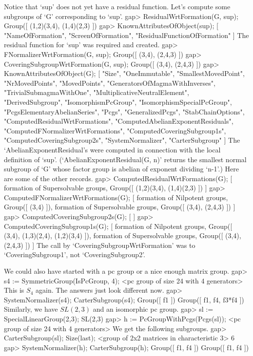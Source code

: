 Notice that `sup' does not yet have a residual function.
 Let's compute some subgroups of `G' corresponding to `sup'.
\beginexample
gap> ResidualWrtFormation(G, sup);
Group([ (1,2)(3,4), (1,4)(2,3) ])
gap> KnownAttributesOfObject(sup);
[ "NameOfFormation", "ScreenOfFormation", "ResidualFunctionOfFormation" ]
\endexample
 The residual function for `sup' was required and created.
\beginexample
gap> FNormalizerWrtFormation(G, sup);
Group([ (3,4), (2,4,3) ])
gap> CoveringSubgroupWrtFormation(G, sup);
Group([ (3,4), (2,4,3) ])
gap> KnownAttributesOfObject(G);
[ "Size", "OneImmutable", "SmallestMovedPoint", "NrMovedPoints", 
  "MovedPoints", "GeneratorsOfMagmaWithInverses", "TrivialSubmagmaWithOne", 
  "MultiplicativeNeutralElement", "DerivedSubgroup", "IsomorphismPcGroup", 
  "IsomorphismSpecialPcGroup", "PcgsElementaryAbelianSeries", "Pcgs", 
  "GeneralizedPcgs", "StabChainOptions", "ComputedResidualWrtFormations", 
  "ComputedAbelianExponentResiduals", "ComputedFNormalizerWrtFormations", 
  "ComputedCoveringSubgroup1s", "ComputedCoveringSubgroup2s", 
  "SystemNormalizer", "CarterSubgroup" ]
\endexample
 The `AbelianExponentResidual's were computed in connection with the
local definition of `sup'. (`AbelianExponentResidual(G, n)' returns
the smallest normal subgroup of `G' whose factor group is abelian of
exponent dividing `n-1'.) Here are some of the other records.
\beginexample
gap> ComputedResidualWrtFormations(G);
[ formation of Supersolvable groups, Group([ (1,2)(3,4), (1,4)(2,3) ]) ]
gap> ComputedFNormalizerWrtFormations(G);
[ formation of Nilpotent groups, Group([ (3,4) ]), 
  formation of Supersolvable groups, Group([ (3,4), (2,4,3) ]) ]
gap> ComputedCoveringSubgroup2s(G);
[  ]
gap> ComputedCoveringSubgroup1s(G);
[ formation of Nilpotent groups, Group([ (3,4), (1,3)(2,4), (1,2)(3,4) ]), 
  formation of Supersolvable groups, Group([ (3,4), (2,4,3) ]) ]
\endexample
The call by `CoveringSubgroupWrtFormation' was to `CoveringSubgroup1', not
`CoveringSubgroup2'.

We could also have started with a pc group or a nice enough matrix group.
\beginexample
gap> s4 := SymmetricGroup(IsPcGroup, 4);
<pc group of size 24 with 4 generators>
\endexample
This is $S_4$ again. The answers just look different now.
\beginexample
gap> SystemNormalizer(s4); CarterSubgroup(s4);
Group([ f1 ])
Group([ f1, f4, f3*f4 ])
\endexample
Similarly, we have $SL(2,3)$ and an isomorphic pc group.
\beginexample
gap> sl := SpecialLinearGroup(2,3);
SL(2,3)
gap> h := PcGroupWithPcgs(Pcgs(sl));
<pc group of size 24 with 4 generators>
\endexample
We get the following subgroups.
\beginexample
gap> CarterSubgroup(sl); Size(last);
<group of 2x2 matrices in characteristic 3>
6
gap> SystemNormalizer(h); CarterSubgroup(h);
Group([ f1, f4 ])
Group([ f1, f4 ])
\endexample

